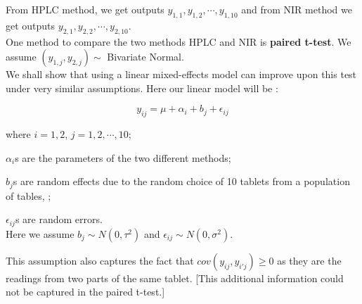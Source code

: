 \documentclass[11pt, a4paper]{article}\usepackage[]{graphicx}\usepackage[]{xcolor}
\begin{document}
From HPLC method, we get outputs $y_{1, 1}, y_{1, 2}, \cdots , y_{1, 10}$ and from NIR method we get outputs $y_{2, 1}, y_{2, 2}, \cdots , y_{2, 10}$. \\

One method to compare the two methods HPLC and NIR is \textbf{paired t-test}. We assume $(y_{1, j}, y_{2, j}) \sim $ Bivariate Normal. \\

We shall show that using a linear mixed-effects model can improve upon this test under very similar assumptions. Here our linear model will be :

$$y_{ij} = \mu + \alpha_i + b_j + \epsilon_{ij}$$

where $i = 1, 2$, $j = 1, 2, \cdots, 10$; 

$\alpha_i$s are the parameters of the two different methods; 

$b_j$s are random effects due to the random choice of 10 tablets from a population of tables, ; 

$\epsilon_{ij}$s are random errors. \\

Here we assume $b_j \sim N(0, \tau^2)$ and $\epsilon_{ij} \sim N(0, \sigma^2)$. 

This assumption also captures the fact that $cov(y_{ij}, y_{i'j}) \geq 0$ as they are the readings from two parts of the same tablet. [This additional information could not be captured in the paired t-test.]
\end{document}
